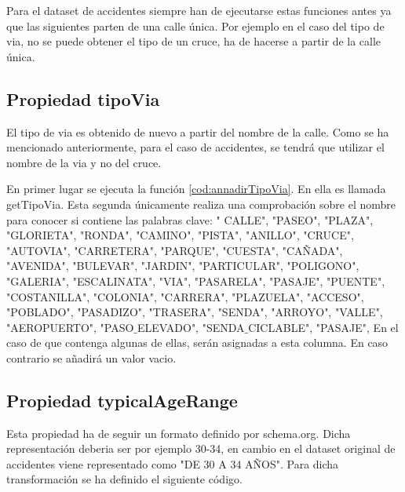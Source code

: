 



Para el dataset de accidentes siempre han de ejecutarse estas funciones antes ya que las siguientes parten de una calle única. Por ejemplo en el caso del tipo de via, no se puede obtener el tipo de un cruce, ha de hacerse a partir de la calle única.



\clearpage
\subsection{Propiedad tipoVia}

El tipo de via es obtenido de nuevo a partir del nombre de la calle. Como se ha mencionado anteriormente, para el caso de accidentes, se tendrá que utilizar el nombre de la via y no del cruce.



En primer lugar se ejecuta la función \ref{cod:annadirTipoVia}. En ella es llamada getTipoVia. Esta segunda únicamente realiza una comprobación sobre el nombre para conocer si contiene las palabras clave: " CALLE", "PASEO", "PLAZA", "GLORIETA", "RONDA", "CAMINO", "PISTA", "ANILLO", "CRUCE", "AUTOVIA", "CARRETERA", "PARQUE", "CUESTA", "CAÑADA", "AVENIDA", "BULEVAR", "JARDIN", "PARTICULAR", "POLIGONO", "GALERIA", "ESCALINATA", "VIA", "PASARELA", "PASAJE", "PUENTE", "COSTANILLA", "COLONIA", "CARRERA", "PLAZUELA", "ACCESO", "POBLADO", "PASADIZO", "TRASERA", "SENDA", "ARROYO", "VALLE", "AEROPUERTO", "PASO$\_$ELEVADO", "SENDA$\_$CICLABLE", "PASAJE",  En el caso de que contenga algunas de ellas, serán asignadas a esta columna. En caso contrario se añadirá un valor vacio.


\subsection{Propiedad typicalAgeRange}

Esta propiedad ha de seguir un formato definido por schema.org. Dicha representación deberia ser por ejemplo 30-34, en cambio en el dataset original de accidentes viene representado como "DE 30 A 34 AÑOS". Para dicha transformación se ha definido el siguiente código.

